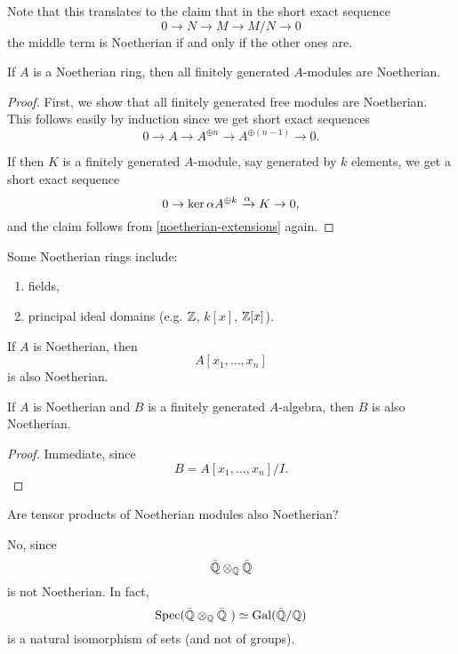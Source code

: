Note that this translates to the claim that in the short exact sequence
\[ 0 \to N \to M \to M/{N} \to 0\]
the middle term is Noetherian if and only if the other ones are.

\begin{corollary}
  If $A$ is a Noetherian ring, then all finitely generated $A$-modules are Noetherian.
\end{corollary}
\begin{proof}
  First, we show that all finitely generated free modules are Noetherian. This follows easily by induction since we get short exact sequences
  \[ 0 \to A \to A^{\oplus n} \to A^{\oplus (n-1)} \to 0.\]

  If then $K$ is a finitely generated $A$-module, say generated by $k$ elements, we get a short exact sequence
  \[ 0 \to \ker{\alpha} A^{\oplus k} \xrightarrow{\alpha} K \to 0,\]
  and the claim follows from \cref{noetherian-extensions} again.
\end{proof}


\begin{example}
  Some Noetherian rings include:
  \begin{enumerate}
  \item fields,
  \item principal ideal domains (e.g. $\mathbb Z$, $k[x]$, $\mathbb Z[x]$).
  \end{enumerate}
\end{example}


\begin{theorem}
  If $A$ is Noetherian, then
  \[ A[x_1, \dotsc, x_n]\]
  is also Noetherian.
\end{theorem}

\begin{corollary}
  If $A$ is Noetherian and $B$ is a finitely generated $A$-algebra, then $B$ is also Noetherian.
\end{corollary}
\begin{proof}
  Immediate, since
  \[ B = A[x_1, \dotsc, x_n]/{I}.\]
\end{proof}

\begin{question}
  Are tensor products of Noetherian modules also Noetherian?
\end{question}
\begin{answer}
  No, since
  \[ \bar {\mathbb Q} \otimes_{\mathbb Q} \bar {\mathbb Q}\]
  is not Noetherian.
  In fact,
  \[ \text{Spec}(\bar {\mathbb Q} \otimes_{\mathbb Q} \bar {\mathbb Q}\ ) \simeq \text{Gal}(\bar{\mathbb Q}/{\mathbb Q}) \]
  is a natural isomorphism of sets (and not of groups).
\end{answer}

